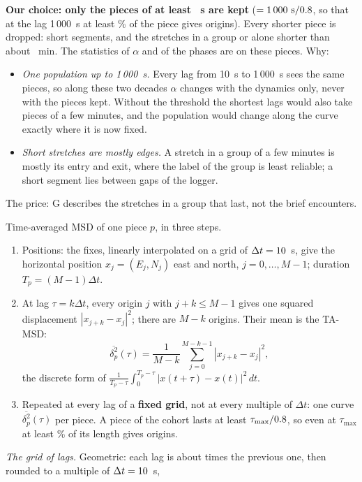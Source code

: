 \documentclass[10pt,a4paper]{article}
\newcommand{\G}{\mathrm{G}}
\begin{document}
\begin{description}[leftmargin=0pt, itemsep=7pt]
  \textbf{Our choice: only the pieces of at least \PieceMinS~s are kept} ($=1\,000~\mathrm{s}/0.8$, so
  that at the lag 1\,000~s at least \SupportOriginsPercent\% of the piece gives origins). Every shorter piece is dropped: short
  segments, and the stretches in a group or alone shorter than about \PieceMinMinutes~min. The statistics of $\alpha$ and of
  the phases are on these pieces. Why:
  \begin{itemize}
  \item \emph{One population up to 1\,000~s.} Every lag from 10~s to 1\,000~s sees the same pieces, so along
    these two decades $\alpha$ changes with the dynamics only, never with the pieces kept. Without the
    threshold the shortest lags would also take pieces of a few minutes, and the population would change
    along the curve exactly where it is now fixed.
  \item \emph{Short stretches are mostly edges.} A stretch in a group of a few minutes is mostly its entry and
    exit, where the label of the group is least reliable; a short segment lies between gaps of the logger.
  \end{itemize}
  The price: $\G$ describes the stretches in a group that last, not the brief encounters.
\item[TA-MSD] Time-averaged MSD of one piece $p$, in three steps.
  \begin{enumerate}
  \item Positions: the fixes, linearly interpolated on a grid of $\Delta t=10$~s, give the horizontal
    position $x_j=(E_j,N_j)$ east and north, $j=0,\dots,M-1$; duration $T_p=(M-1)\Delta t$.
  \item At lag $\tau=k\Delta t$, every origin $j$ with $j+k\le M-1$ gives one squared displacement
    $|x_{j+k}-x_j|^2$; there are $M-k$ origins. Their mean is the TA-MSD:
    \[ \overline{\delta^2_p}(\tau) = \frac{1}{M-k}\sum_{j=0}^{M-k-1}|x_{j+k}-x_j|^2 , \]
    the discrete form of $\frac{1}{T_p-\tau}\int_0^{T_p-\tau}|x(t+\tau)-x(t)|^2\,dt$.
  \item Repeated at every lag of a \textbf{fixed grid}, not at every multiple of $\Delta t$: one curve
    $\overline{\delta^2_p}(\tau)$ per piece. A piece of the cohort lasts at least $\tau_\mathrm{max}/0.8$, so
    even at $\tau_\mathrm{max}$ at least \SupportOriginsPercent\% of its length gives origins.
  \end{enumerate}
  \emph{The grid of lags.} Geometric: each lag is about \LagRatio{} times the previous one, then rounded to a
  multiple of $\Delta t=10$~s,

\end{description}
\end{document}
